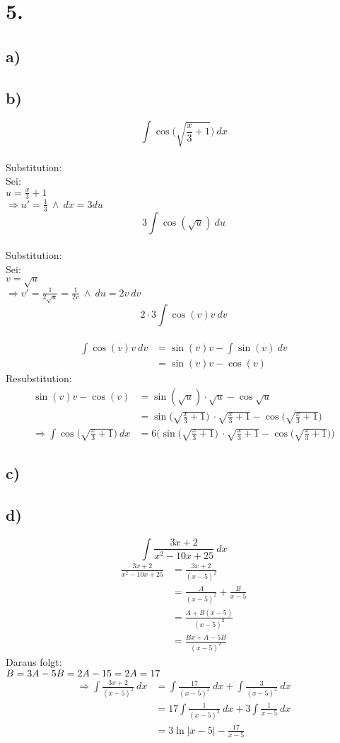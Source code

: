 \documentclass[a4paper]{scrartcl}
\begin{document}
\newpage
\section{5.}
\subsection{a)}
\subsection{b)}
\[\int\cos\Big(\sqrt{\frac{x}{3}+1}\Big)\ dx\]\\
Substitution:\\
Sei:\\
\(u=\frac{x}{3}+1\)\\
\(\Rightarrow u'=\frac{1}{3}\ \land \ dx=3du\)\\
\[3\int\cos(\sqrt{u})\ du\]\\
Substitution:\\
Sei:\\
\(v=\sqrt{u}\)\\
\(\Rightarrow v'=\frac{1}{2\sqrt{u}}=\frac{1}{2v}\ \land \ du=2v\ dv\)\\
\[2\cdot 3\int\cos(v)v\ dv\]\\
\begin{align}
\int\cos(v)v\ dv&=\sin(v)v-\int\sin(v)\ dv\\
	&=\sin(v)v-\cos(v)
\end{align}
Resubstitution:
\begin{align}
\sin(v)v-\cos(v)&=\sin(\sqrt{u})\cdot\sqrt{u}-\cos\sqrt{u}\\
	&=\sin\Big(\sqrt{\frac{x}{3}+1}\Big)\ \cdot\sqrt{\frac{x}{3}+1}-\cos\Big(\sqrt{\frac{x}{3}+1}\Big)\\
	\Rightarrow \int\cos\Big(\sqrt{\frac{x}{3}+1}\Big)\ dx &=6\Bigg(\sin\Big(\sqrt{\frac{x}{3}+1}\Big)\ \cdot\sqrt{\frac{x}{3}+1}-\cos\Big(\sqrt{\frac{x}{3}+1}\Big)\Bigg)
\end{align}
\subsection{c)}
\subsection{d)}
\[\int\frac{3x+2}{x^2-10x+25}\ dx\]
\begin{align}
\frac{3x+2}{x^2-10x+25}&=\frac{3x+2}{(x-5)^2}\\
	&=\frac{A}{(x-5)^2}+\frac{B}{x-5}\\
	&=\frac{A+B(x-5)}{(x-5)^2}\\
	&=\frac{Bx+A-5B}{(x-5)^2}
\end{align}
Daraus folgt:\\
\(B=3\\
A-5B=2\\
A-15=2\\
A=17\)
\begin{align}
\Rightarrow\int\frac{3x+2}{(x-5)^2}\ dx&=\int\frac{17}{(x-5)^2}\ dx+\int\frac{3}{(x-5)^2}\ dx\\
	&=17\int\frac{1}{(x-5)^2}\ dx+3\int\frac{1}{x-5}\ dx\\
	&=3\ln |x-5|-\frac{17}{x-5}
\end{align}
\end{document}
